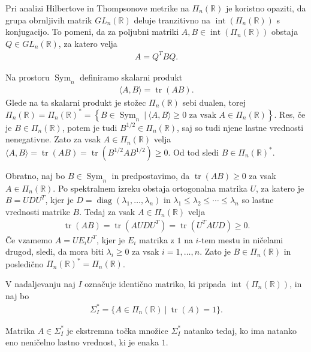 \documentclass[mat2, tisk]{fmfdelo}
\newcommand{\R}{\mathbb{R}}
\begin{document}
Pri analizi Hilbertove in Thompsonove metrike na $\Pi_n(\R)$ je
koristno opaziti, da grupa obrnljivih matrik
$GL_n(\R)$ deluje tranzitivno na
$\operatorname{int}(\Pi_n(\R))$ s konjugacijo. To pomeni, da za poljubni
matriki $A,B\in\operatorname{int}(\Pi_n(\R))$ obstaja
$Q\in GL_n(\R)$, za katero velja
\begin{align*}
A=Q^T B Q.
\end{align*}

Na prostoru $\operatorname{Sym}_n$ definiramo skalarni produkt
\begin{align*}
\langle A,B\rangle
=
\operatorname{tr}(AB).
\end{align*}
Glede na ta skalarni produkt je stožec $\Pi_n(\R)$ sebi dualen, torej 
$\Pi_n(\R) = \Pi_n(\R)^* =
\left\{B\in\operatorname{Sym}_n ~|~ 
\langle A,B\rangle\geq0
\text{ za vsak } A\in\Pi_n(\R)
\right\}$.
Res, če je $B\in\Pi_n(\R)$, potem je tudi
$B^{1/2}\in\Pi_n(\R)$, saj so tudi njene lastne vrednosti nenegativne. Zato za vsak $A\in\Pi_n(\R)$ velja
$\langle A,B\rangle =
\operatorname{tr}(AB)=
\operatorname{tr}(B^{1/2}AB^{1/2})\geq0$.
Od tod sledi $B\in\Pi_n(\R)^*$.

Obratno, naj bo $B\in\operatorname{Sym}_n$ in predpostavimo, da
$\operatorname{tr}(AB)\geq0$
za vsak $A\in\Pi_n(\R)$. Po spektralnem izreku obstaja ortogonalna
matrika $U$, za katero je $B =UDU^T$,
kjer je $D=\operatorname{diag}(\lambda_1,\ldots,\lambda_n)$
in $\lambda_1\leq\lambda_2\leq\cdots\leq\lambda_n$
so lastne vrednosti matrike $B$. Tedaj za vsak
$A\in\Pi_n(\R)$ velja
\begin{align*}
\operatorname{tr}(AB)=
\operatorname{tr}(AU DU^T)=\operatorname{tr}(U^T A U D)\geq0.
\end{align*}
Če vzamemo $A=U E_i U^T$, kjer je $E_i$ matrika z $1$ na $i$-tem mestu in ničelami drugod, 
sledi, da mora biti $\lambda_i\geq0$
za vsak $i=1,\ldots,n$. Zato je $B\in\Pi_n(\R)$ in posledično $\Pi_n(\R)^* = \Pi_n(\R)$.

V nadaljevanju naj $I$ označuje identično matriko, ki pripada
$\operatorname{int}(\Pi_n(\R))$, in naj bo
\begin{align*}
\Sigma_I^*
=
\{A\in\Pi_n(\R) ~|~ \operatorname{tr}(A)=1\}.
\end{align*}

\begin{lema}\label{lema:ekstremne_tocke_psd}
Matrika $A\in\Sigma_I^*$ je ekstremna točka množice $\Sigma_I^*$
natanko tedaj, ko ima natanko eno neničelno lastno vrednost, ki je
enaka $1$.
\end{lema}
\end{document}

